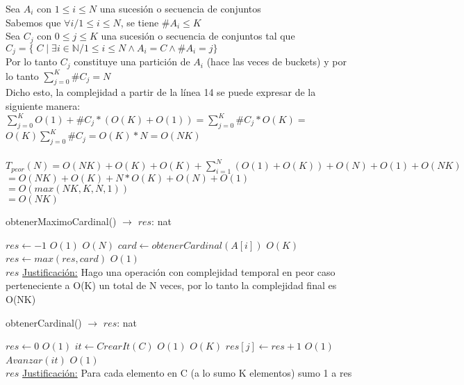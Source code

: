 \documentclass[10pt, a4paper]{article}
\begin{document}
Sea $A_i$ con $1 \leq i \leq N$ una sucesión o secuencia de conjuntos\\
Sabemos que $\forall i / 1 \leq i \leq N$, se tiene $\#A_i \leq K$\\
Sea $C_j$ con $0 \leq j \leq K$ una sucesión o secuencia de conjuntos tal que\\
$C_j = \{ \; C \; | \; \exists i \in \mathbb{N} / 1 \leq i \leq N \wedge A_i = C \wedge \#A_i = j \}$ \\
Por lo tanto $C_j$ constituye una partición de $A_i$ (hace las veces de buckets) y por lo tanto $\sum_{j=0}^{K}\#C_j = N$ \\
Dicho esto, la complejidad a partir de la línea 14 se puede expresar de la siguiente manera: \\
$\sum_{j=0}^{K} O(1) + \#C_j * (O(K) + O(1)) = \sum_{j=0}^{K}\#C_j * O(K) =$\\
$O(K)\sum_{j=0}^{K}\#C_j = O(K)*N = O(NK)$
\\\\
 
$T_{peor}(N) = O(NK) + O(K) + O(K) + \sum_{i=1}^{N}(O(1) + O(K)) + O(N) + O(1) + O(NK)$\\
$= O(NK) + O(K) + N*O(K) + O(N) + O(1)$ \\
$= O(max(NK, K, N, 1))$\\
$= O(NK)$\\

\begin{algorithm}[H]{obtenerMaximoCardinal() $\to$ $res$: nat}	
	\begin{algorithmic}[1]
			 \State $res \gets -1$			\Comment $O(1)$
			 			\Comment $O(N)$
			 	\State $card\gets obtenerCardinal(A[i])$			\Comment $O(K)$
			 	\State $res\gets max(res, card)$			\Comment $O(1)$
			 \EndFor \\
			\Return $res$
		\medskip
		\Statex \underline{Justificación:} Hago una operación con complejidad temporal en peor caso perteneciente a O(K) un total de N veces, por lo tanto la complejidad final es O(NK)
    \end{algorithmic}
\end{algorithm}	



\begin{algorithm}[H]{obtenerCardinal() $\to$ $res$: nat}	
	\begin{algorithmic}[1]
			\State $res \gets 0$			\Comment $O(1)$
    		\State $it \gets CrearIt(C)$	\Comment $O(1)$
    					\Comment $O(K)$
			 	\State $res[j]\gets res+1$	\Comment $O(1)$
			 	\State $Avanzar(it)$	\Comment $O(1)$
			 \EndWhile \\
			\Return $res$
		\medskip
		\Statex \underline{Justificación:} Para cada elemento en C (a lo sumo K elementos) sumo 1 a res
    \end{algorithmic}
\end{algorithm}
\end{document}
